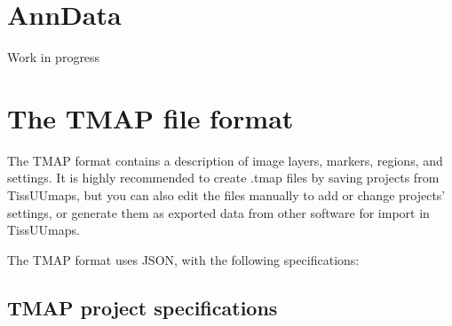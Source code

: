 \documentclass[letterpaper,10pt,english,openany,oneside]{sphinxmanual}
\begin{document}
\sphinxstepscope


\section{AnnData}
\label{\detokenize{docs/advanced/anndata:anndata}}\label{\detokenize{docs/advanced/anndata::doc}}
\sphinxAtStartPar
Work in progress

\sphinxstepscope


\section{The TMAP file format}
\label{\detokenize{docs/advanced/tmap:the-tmap-file-format}}\label{\detokenize{docs/advanced/tmap::doc}}
\sphinxAtStartPar
The TMAP format contains a description of image layers, markers, regions, and settings. It is highly recommended to create .tmap files by saving projects from TissUUmaps, but you can also edit the files manually to add or change projects’ settings, or generate them as exported data from other software for import in TissUUmaps.

\sphinxAtStartPar
The TMAP format uses JSON, with the following specifications:


\subsection{TMAP project specifications}
\label{\detokenize{docs/advanced/tmap:tmap-project-specifications}}\label{\detokenize{docs/advanced/tmap:tmap-project-specifications}}
\end{document}
